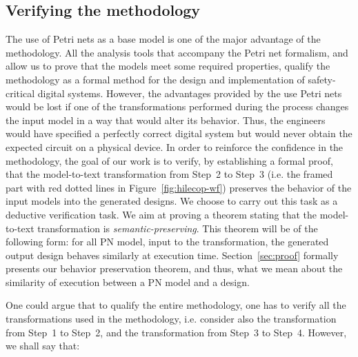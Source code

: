 \documentclass[pdflatex,sn-mathphys]{sn-jnl}%
\theoremstyle{thmstyleone}%
\theoremstyle{thmstyletwo}%
\theoremstyle{thmstylethree}%
\begin{document}
\subsection{Verifying the \hilecop{} methodology}
\label{sec:verif-hilecop}

The use of Petri nets as a base model is one of the major advantage of
the \hilecop{} methodology. All the analysis tools that accompany the
Petri net formalism, and allow us to prove that the models meet some
required properties, qualify the \hilecop{} methodology as a formal
method for the design and implementation of safety-critical digital
systems. However, the advantages provided by the use Petri nets would
be lost if one of the transformations performed during the process
changes the input model in a way that would alter its behavior. Thus,
the engineers would have specified a perfectly correct digital system
but would never obtain the expected circuit on a physical device. In
order to reinforce the confidence in the \hilecop{} methodology, the
goal of our work is to verify, by establishing a formal proof, that
the model-to-text transformation from Step~2 to Step~3 (i.e. the
framed part with red dotted lines in Figure~\ref{fig:hilecop-wf})
preserves the behavior of the input models into the generated \vhdl{}
designs. We choose to carry out this task as a deductive verification
task.  We aim at proving a theorem stating that the \hilecop{}
model-to-text transformation is \textit{semantic-preserving}. This
theorem will be of the following form: for all PN model, input to the
\hilecop{} transformation, the generated output \vhdl{} design behaves
similarly at execution time. Section~\ref{sec:proof} formally presents
our behavior preservation theorem, and thus, what we mean about the
similarity of execution between a PN model and a \vhdl{} design.

One could argue that to qualify the entire \hilecop{} methodology, one
has to verify all the transformations used in the methodology,
i.e. consider also the transformation from Step~1 to Step~2, and the
transformation from Step~3 to Step~4. However, we shall say that:
\end{document}
